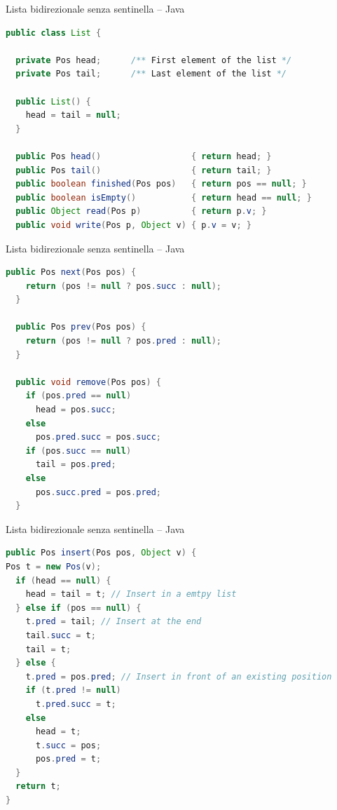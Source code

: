 \begin{frame}[fragile,shrink=10]{Lista bidirezionale senza sentinella -- Java}

\vspace{-12pt}
\begin{lstlisting}[language=java]
public class List {

  private Pos head;      /** First element of the list */
  private Pos tail;      /** Last element of the list */

  public List() { 
    head = tail = null;
  }

  public Pos head()                  { return head; }
  public Pos tail()                  { return tail; }
  public boolean finished(Pos pos)   { return pos == null; }
  public boolean isEmpty()           { return head == null; }
  public Object read(Pos p)          { return p.v; }
  public void write(Pos p, Object v) { p.v = v; }
\end{lstlisting}
\end{frame}

\begin{frame}[fragile,shrink=3]{Lista bidirezionale senza sentinella -- Java}
\vspace{-12pt}
\begin{lstlisting}[language=java]
  public Pos next(Pos pos) { 
    return (pos != null ? pos.succ : null); 
  }

  public Pos prev(Pos pos) { 
    return (pos != null ? pos.pred : null); 
  }

  public void remove(Pos pos) {
    if (pos.pred == null) 
      head = pos.succ;
    else 
      pos.pred.succ = pos.succ;
    if (pos.succ == null) 
      tail = pos.pred;
    else 
      pos.succ.pred = pos.pred;
  }
\end{lstlisting}
\end{frame}


\begin{frame}[fragile,shrink=5]{Lista bidirezionale senza sentinella -- Java}
\vspace{-12pt}
\begin{lstlisting}[language=java]
public Pos insert(Pos pos, Object v) {
Pos t = new Pos(v);
  if (head == null) {
    head = tail = t; // Insert in a emtpy list
  } else if (pos == null) {
    t.pred = tail; // Insert at the end
    tail.succ = t;
    tail = t;
  } else {
    t.pred = pos.pred; // Insert in front of an existing position
    if (t.pred != null)
      t.pred.succ = t;
    else 
      head = t;
      t.succ = pos;
      pos.pred = t;
  }
  return t;
}
\end{lstlisting}
\end{frame}

